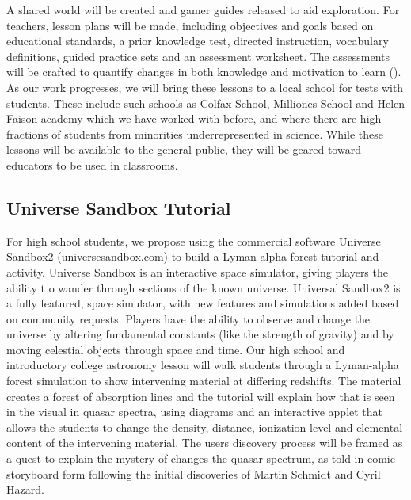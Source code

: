  A shared world will be created and gamer guides 
released to aid exploration. For teachers, lesson plans will be made, 
including  objectives and goals based on educational standards, a 
prior knowledge test, 
directed instruction, vocabulary definitions, guided practice sets and 
an assessment 
worksheet.
The assessments will be crafted to quantify changes in both knowledge 
and motivation to learn (\citealt{Rosas03}).
 As our work progresses, we will bring these lessons to a local 
school 
for tests with students.
These include such schools as Colfax School, Milliones School and Helen Faison
academy which we have worked with before, and where there are high fractions
of students from minorities underrepresented in science.
 While these lessons will be available to the 
general public, they will be geared toward educators to be used in classrooms.

\subsection{Universe Sandbox Tutorial}


For high school students, we propose using the commercial software
Universe Sandbox2 (universesandbox.com) to build a Lyman-alpha forest
tutorial and activity.  Universe Sandbox is an interactive space
simulator, giving players the ability t o wander through sections of
the known universe. Universal Sandbox2 is a fully featured, space
simulator, with new features and simulations added based on community
requests. Players have the ability to observe and change the universe
by altering fundamental constants (like the strength of gravity) and
by moving celestial objects through space and time.  Our high school
and introductory college astronomy lesson will walk students through a
Lyman-alpha forest simulation to show intervening material at
differing redshifts. The material creates a forest of absorption lines
and the tutorial will explain how that is seen in the visual in quasar
spectra, using diagrams and an interactive applet that allows the
students to change the density, distance, ionization level and
elemental content of the intervening material. The users discovery
process will be framed as a quest to explain the mystery of changes
the quasar spectrum, as told in comic storyboard form following the
initial discoveries of Martin Schmidt and Cyril Hazard.




